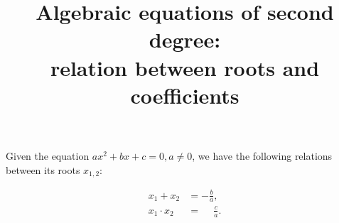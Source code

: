 \documentclass[a4paper,11pt]{article}
\title{Algebraic equations of second degree:\\
relation between roots and coefficients}
\author{}
\date{}
\begin{document}
\maketitle


Given the equation \auxiliaryspace
  \tagmcend
\tagstructend
 \( a x^2 + bx + c= 0, a\not=0 \), 
 we have the following relations between its roots \auxiliaryspace
  \tagmcend
\tagstructend
 \( x_{1,2} \):

\begin{align*}
x_1+x_2 & = -\frac{b}{a},\\
   x_1\cdot x_2 &= \phantom{-}\frac{c}{a}.
\end{align*}
\end{document}
